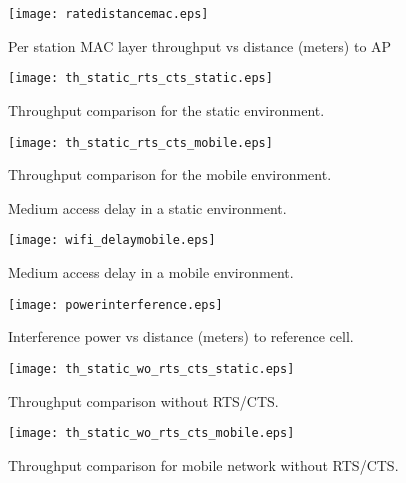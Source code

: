 \documentclass[peerreview,draftcls,onecolumn,12pt,a4paper]{IEEEtran}
\begin{document}
\begin{figure}[h!]
\centering
\texttt{[image: ratedistancemac.eps]}
\caption{Per station MAC layer throughput vs distance (meters) to
AP}
 \label{fig:macratevsdistance}
\end{figure}

\begin{figure}[h!]
\centering
   \texttt{[image: th\_static\_rts\_cts\_static.eps]}
\caption{Throughput comparison for the static environment.}
\label{fig:staticth}
\end{figure}

\pagebreak

\begin{figure}[h!]
    \centering
    \texttt{[image: th\_static\_rts\_cts\_mobile.eps]}
    \caption{Throughput comparison for the mobile environment.}
    \label{fig:mobileth}
\end{figure}


\begin{figure}[h!]
    \caption{Medium access delay in a static environment.}
    \label{fig:delaystatic}
\end{figure}

\begin{figure}[h!]
\centering
   \texttt{[image: wifi\_delaymobile.eps]}
\caption{\label{fig:delaymobile} Medium access delay in a mobile
environment.}
\end{figure}


\begin{figure}[h!]
\centering
   \texttt{[image: powerinterference.eps]}
\caption{\label{fig:powerinterference} Interference power vs
distance (meters) to reference cell.}
\end{figure}

\begin{figure}[h!]
\centering
   \texttt{[image: th\_static\_wo\_rts\_cts\_static.eps]}
\caption{\label{fig:thnorts} Throughput comparison without RTS/CTS.}
\end{figure}

\begin{figure}[h!]
\centering
   \texttt{[image: th\_static\_wo\_rts\_cts\_mobile.eps]}
\caption{\label{fig:thnortsmobile} Throughput comparison for mobile network without RTS/CTS.}
\end{figure}
\end{document}
